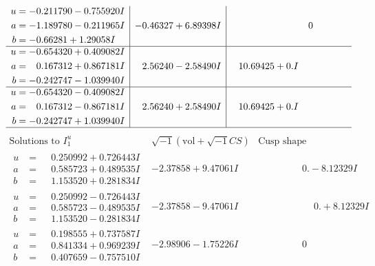 \documentclass[1p]{elsarticle_modified}
\theoremstyle{definition}
\newcommand{\I}{\sqrt{-1}}
\begin{document}
$$\begin{array}{c|c|c}
\begin{aligned}
u &= -0.211790 - 0.755920 I \\
a &= -1.189780 - 0.211965 I \\
b &= -0.66281 + 1.29058 I\end{aligned}
 & -0.46327 + 6.89398 I & \phantom{-0.000000 } 0 \\ \hline\begin{aligned}
u &= -0.654320 + 0.409082 I \\
a &= \phantom{-}0.167312 + 0.867181 I \\
b &= -0.242747 - 1.039940 I\end{aligned}
 & \phantom{-}2.56240 - 2.58490 I & \phantom{-}10.69425 + 0. I\phantom{ +0.000000I} \\ \hline\begin{aligned}
u &= -0.654320 - 0.409082 I \\
a &= \phantom{-}0.167312 - 0.867181 I \\
b &= -0.242747 + 1.039940 I\end{aligned}
 & \phantom{-}2.56240 + 2.58490 I & \phantom{-}10.69425 + 0. I\phantom{ +0.000000I}\\
 \hline 
 \end{array}$$\newpage$$\begin{array}{c|c|c}  
\text{Solutions to }I^u_{1}& \I (\text{vol} + \sqrt{-1}CS) & \text{Cusp shape}\\
 \hline 
\begin{aligned}
u &= \phantom{-}0.250992 + 0.726443 I \\
a &= \phantom{-}0.585723 + 0.489535 I \\
b &= \phantom{-}1.153520 + 0.281834 I\end{aligned}
 & -2.37858 + 9.47061 I & \phantom{-0.000000 } 0. - 8.12329 I \\ \hline\begin{aligned}
u &= \phantom{-}0.250992 - 0.726443 I \\
a &= \phantom{-}0.585723 - 0.489535 I \\
b &= \phantom{-}1.153520 - 0.281834 I\end{aligned}
 & -2.37858 - 9.47061 I & \phantom{-0.000000 -}0. + 8.12329 I \\ \hline\begin{aligned}
u &= \phantom{-}0.198555 + 0.737587 I \\
a &= \phantom{-}0.841334 + 0.969239 I \\
b &= \phantom{-}0.407659 - 0.757510 I\end{aligned}
 & -2.98906 - 1.75226 I & \phantom{-0.000000 } 0 \\ \hline\begin{aligned}

\end{aligned}
\end{array}$$
\end{document}
